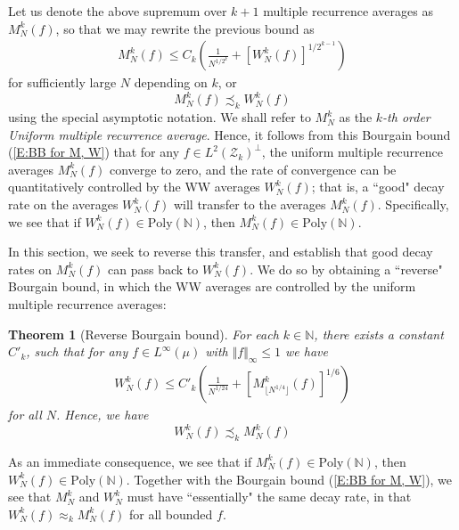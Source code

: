 \documentclass[11pt, oneside]{amsart}   	%
\newcommand{\1}{\mathbbm{1}}
\newcommand{\N}{\mathbb{N}}
\newcommand{\floor}[1]{\lfloor#1\rfloor}
\newtheorem{theorem}{Theorem}[section]
\theoremstyle{definition}
\begin{document}
Let us denote the above supremum over $k+1$ multiple recurrence averages as $M^k_N(f)$, so that we may rewrite the previous bound as
\begin{align}\label{E:BB for M, W}
M_N^k(f) \leq C_{k} \left( \frac{1}{N^{1/2^k}} + \left[W_N^k (f)\right]^{1/2^{k-1}} \right)
\end{align}
for sufficiently large $N$ depending on $k$, or
$$M_N^k(f) \precsim_k W_N^k(f)$$
using the special asymptotic notation. We shall refer to $M_N^k$ as the \textit{$k$-th order Uniform multiple recurrence average}. Hence, it follows from this Bourgain bound (\ref{E:BB for M, W}) that for any $f\in L^2(\mathcal{Z}_k)^\perp$, the uniform multiple recurrence averages $M_N^k(f)$ converge to zero, and the rate of convergence can be quantitatively controlled by the WW averages $W_N^k(f)$; that is, a ``good" decay rate on the averages $W_N^k(f)$ will transfer to the averages $M_N^k(f)$. Specifically, we see that if $W_N^k(f) \in \text{Poly}(\N)$, then $M_N^k(f) \in \text{Poly}(\N)$.

In this section, we seek to reverse this transfer, and establish that good decay rates on $M_N^k(f)$ can pass back to $W_N^k(f)$. We do so by obtaining a ``reverse" Bourgain bound, in which the WW averages are controlled by the uniform multiple recurrence averages:
\begin{theorem}[Reverse Bourgain bound]\label{T:reverse BB, simplest case}
For each $k\in \N$, there exists a constant $C'_k$, such that for any $f\in L^\infty(\mu)$ with $\Vert f\Vert_\infty \leq 1$ we have 
\begin{align}\label{E:RBB for W, M}
W_N^k(f) \leq C'_k \left(\frac{1}{N^{1/24}} + \left[M_{\floor{N^{1/4}}}^k(f)\right]^{1/6} \right)
\end{align}
for all $N$. Hence, we have
$$W_N^k(f) \precsim_{k} M_N^k(f)$$
\end{theorem}
As an immediate consequence, we see that if $M_N^k(f) \in \text{Poly}(\N)$, then $W_N^k(f) \in \text{Poly}(\N)$. Together with the Bourgain bound (\ref{E:BB for M, W}), we see that $M_N^k$ and $W_N^k$ must have ``essentially" the same decay rate, in that $W_N^k(f) \approx_k M_N^k(f)$ for all bounded $f$.
\end{document}
